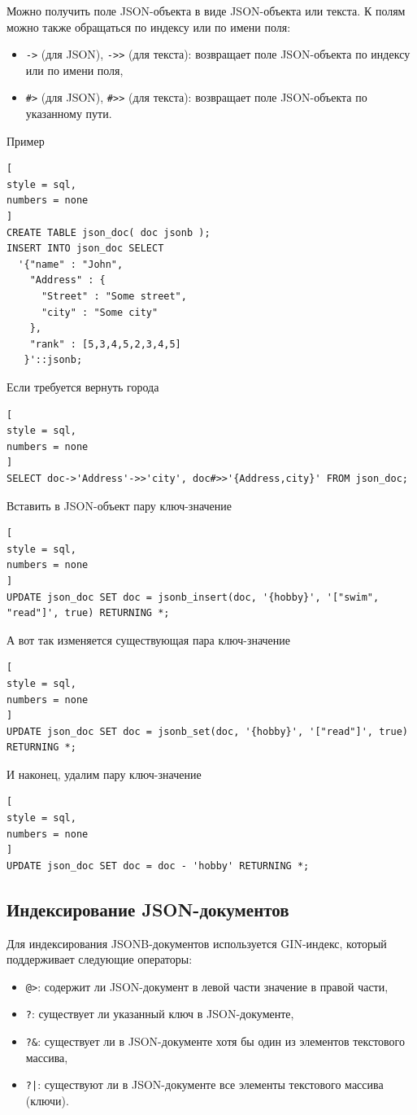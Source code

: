 \documentclass[%
	11pt,
	a4paper,
	utf8,
		]{article}
\begin{document}
Можно получить поле JSON-объекта в виде JSON-объекта или текста. К полям можно также обращаться по индексу или по имени поля:
\begin{itemize}
	\item \verb|->| (для JSON), \verb|->>| (для текста): возвращает поле JSON-объекта по индексу или по имени поля,
	
	\item \verb|#>| (для JSON), \verb|#>>| (для текста): возвращает поле JSON-объекта по указанному пути.
\end{itemize}

Пример
\begin{lstlisting}[
style = sql,
numbers = none
]
CREATE TABLE json_doc( doc jsonb );
INSERT INTO json_doc SELECT
  '{"name" : "John",
    "Address" : {
      "Street" : "Some street",
      "city" : "Some city"
    },
    "rank" : [5,3,4,5,2,3,4,5]
   }'::jsonb;
\end{lstlisting}

Если требуется вернуть города 
\begin{lstlisting}[
style = sql,
numbers = none
]
SELECT doc->'Address'->>'city', doc#>>'{Address,city}' FROM json_doc;
\end{lstlisting}

Вставить в JSON-объект пару ключ-значение
\begin{lstlisting}[
style = sql,
numbers = none
]
UPDATE json_doc SET doc = jsonb_insert(doc, '{hobby}', '["swim", "read"]', true) RETURNING *;
\end{lstlisting}

А вот так изменяется существующая пара ключ-значение
\begin{lstlisting}[
style = sql,
numbers = none
]
UPDATE json_doc SET doc = jsonb_set(doc, '{hobby}', '["read"]', true) RETURNING *;
\end{lstlisting}

И наконец, удалим пару ключ-значение
\begin{lstlisting}[
style = sql,
numbers = none
]
UPDATE json_doc SET doc = doc - 'hobby' RETURNING *;
\end{lstlisting}

\subsection{Индексирование JSON-документов}

Для индексирования JSONB-документов используется GIN-индекс, который поддерживает следующие операторы:
\begin{itemize}
	\item \verb|@>|: содержит ли JSON-документ в левой части значение в правой части,
	
	\item \verb|?|: существует ли указанный ключ в JSON-документе,
	
	\item \verb|?&|: существует ли в JSON-документе хотя бы один из элементов текстового массива,
	
	\item \texttt{?|}: существуют ли в JSON-документе все элементы текстового массива (ключи).
\end{itemize}
\end{document}
